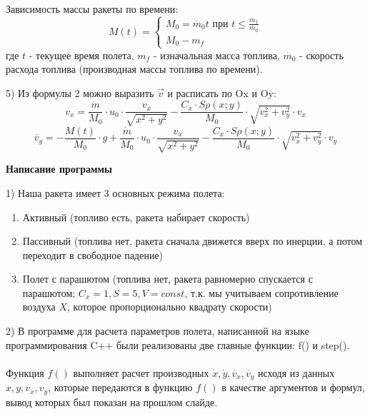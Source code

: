 \documentclass {report}
\begin{document}
Зависимость массы ракеты по времени:
\begin{equation}
M(t) = 
\begin{cases}
M_0 = \dot{m_0}t \mbox{ при } t \leqslant \frac{m_f}{\dot{m_0}} \\
M_0 - m_f
\end{cases}
\end{equation}
где $t$ - текущее время полета, $m_f$ - изначальная масса топлива, $\dot{m_0}$ - скорость расхода топлива (производная массы топлива по времени).

\bigskip

5) Из формулы 2 можно выразить $\vec{v}$ и расписать по Ox и Oy:
$$
\dot{v_x} = \frac{\dot{m}}{M_0}\cdot u_0 \cdot \frac{v_x}{\sqrt{x^2 + y^2}} - \frac{C_x\cdot S\rho(x; y)}{M_0} \cdot \sqrt{v_x^2 + v_y^2} \cdot v_x
$$
$$
\dot{v_y} = -\frac{M(t)}{M_0} \cdot g + \frac{\dot{m}}{M_0}\cdot u_0 \cdot \frac{v_x}{\sqrt{x^2 + y^2}} - \frac{C_x\cdot S\rho(x; y)}{M_0} \cdot \sqrt{v_x^2 + v_y^2} \cdot v_y
$$

\bigskip
\begin {center}
{\Large \bf
Написание программы
}
\end {center}

\bigskip

1) Наша ракета имеет 3 основных режима полета:
\begin{enumerate}
\item Активный (топливо есть, ракета набирает скорость)
\item Пассивный (топлива нет, ракета сначала движется вверх по инерции, а потом переходит в свободное падение)
\item Полет с парашютом (топлива нет, ракета равномерно спускается с парашютом; $C_x=1, S=5, V=const$, т.к. мы учитываем сопротивление воздуха $X$, которое пропорционально квадрату скорости)
\end{enumerate}

\bigskip

2) В программе для расчета параметров полета, написанной на языке программирования C++ были реализованы две главные функции: f() и step(). \\\\
Функция $f()$ выполняет расчет производных $\dot{x}, \dot{y}, \dot{v_x}, \dot{v_y}$ исходя из данных $x, y, v_x, v_y$, которые передаются в функцию $f()$ в качестве аргументов и формул, вывод которых был показан на прошлом слайде.
\end{document}
